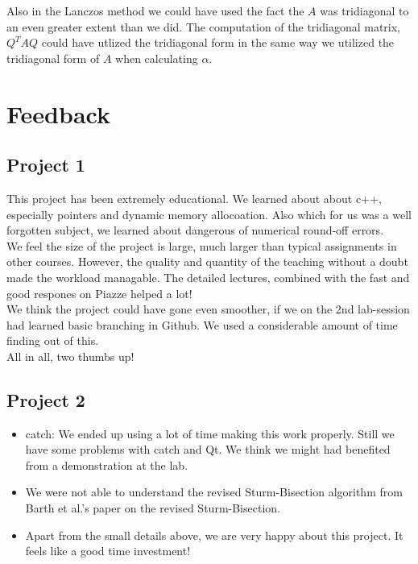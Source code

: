 \documentclass{article}
\begin{document}
Also in the Lanczos method we could have used the fact the $A$ was tridiagonal to an even greater extent than we did. The computation of the tridiagonal matrix, $Q^TAQ$ could have utlized the tridiagonal form in the same way we utilized the tridiagonal form of $A$ when calculating $\alpha$.





\section{Feedback}
\subsection{Project 1}
This project has been extremely educational. We learned about about c++, especially pointers and dynamic memory allocoation. Also which for us was a well forgotten subject, we learned about dangerous of numerical round-off errors. \\

We feel the size of the project is large, much larger than typical assignments in other courses. However, the quality and quantity of the teaching without a doubt made the workload managable. The detailed lectures, combined with the fast and good respones on Piazze helped a lot!\\

We think the project could have gone even smoother, if we on the 2nd lab-session had learned basic branching in Github. We used a considerable amount of time finding out of this.\\

All in all, two thumbs up!

\subsection{Project 2}
\begin{itemize}
	\item  catch: We ended up using a lot of time making this work properly. Still we have some problems with catch and Qt. We think we might had benefited from a demonstration at the lab.
	
	\item We were not able to understand the revised Sturm-Bisection algorithm from Barth et al.'s \cite{barth} paper on the revised Sturm-Bisection. 
	
	\item Apart from the small details above, we are very happy about this project. It feels like a good time investment!
\end{itemize}
\end{document}
